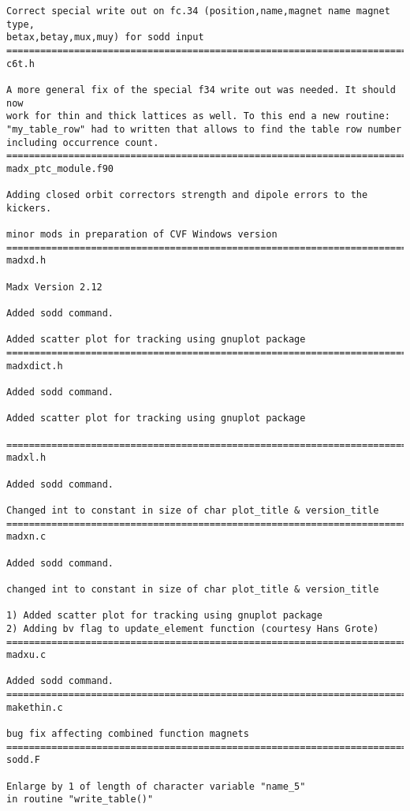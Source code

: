 \begin{verbatim}
Correct special write out on fc.34 (position,name,magnet name magnet type,
betax,betay,mux,muy) for sodd input
=============================================================================
c6t.h

A more general fix of the special f34 write out was needed. It should now
work for thin and thick lattices as well. To this end a new routine:
"my_table_row" had to written that allows to find the table row number
including occurrence count.
=============================================================================
madx_ptc_module.f90

Adding closed orbit correctors strength and dipole errors to the kickers.

minor mods in preparation of CVF Windows version
=============================================================================
madxd.h

Madx Version 2.12

Added sodd command.

Added scatter plot for tracking using gnuplot package
=============================================================================
madxdict.h

Added sodd command.

Added scatter plot for tracking using gnuplot package

=============================================================================
madxl.h

Added sodd command.

Changed int to constant in size of char plot_title & version_title
=============================================================================
madxn.c

Added sodd command.

changed int to constant in size of char plot_title & version_title

1) Added scatter plot for tracking using gnuplot package
2) Adding bv flag to update_element function (courtesy Hans Grote)
=============================================================================
madxu.c

Added sodd command.
=============================================================================
makethin.c

bug fix affecting combined function magnets
=============================================================================
sodd.F

Enlarge by 1 of length of character variable "name_5"
in routine "write_table()"


\end{verbatim}
